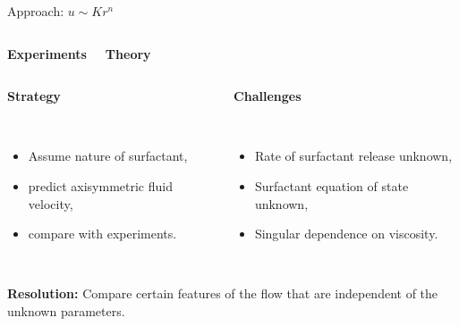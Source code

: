\documentclass[compress,10pt,dvipsnames,svgnames,pdftex]{beamer}
\begin{document}
\begin{frame}{Approach: $u \sim K r^n$}
\begin{columns}
\column{6cm}
\begin{mdframed}[style=MyFrame]
\centerline{\bf Experiments}
\end{mdframed}
\column{6cm}
\begin{mdframed}[style=MyFrame]
\centerline{\bf Theory}
{\scriptsize
\centerline{}
}
\end{mdframed}

\end{columns}

\begin{columns}
\column{6cm}
\begin{mdframed}[style=MyFrame]
\centerline{\bf Strategy}
~\\[-5mm]
{\scriptsize
\begin{itemize}
 \item Assume nature of surfactant,
 \item predict axisymmetric fluid velocity,
 \item compare with experiments.
\end{itemize}
}
\end{mdframed}
\column{6cm}
\begin{mdframed}[style=MyFrame]
\centerline{\bf Challenges}
~\\[-5mm]
{\scriptsize
\begin{itemize}
 \item Rate of surfactant release unknown,
 \item Surfactant equation of state unknown,
 \item Singular dependence on viscosity.
\end{itemize}
}
\end{mdframed}
\end{columns}

~\\[3mm]
{\scriptsize {\bf Resolution:} Compare certain features of the flow that are independent of the unknown parameters.}
\end{frame}
\end{document}
